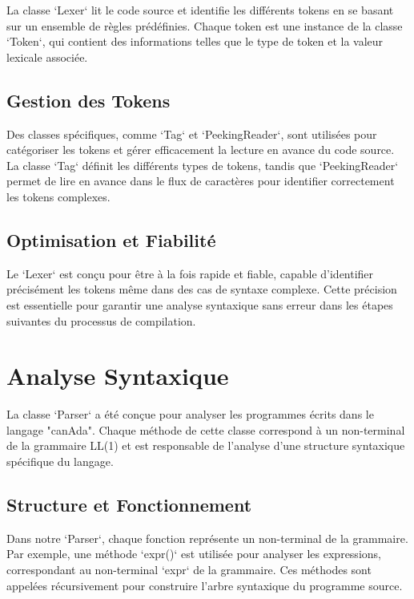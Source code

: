 \documentclass[french,a4paper]{article}
\begin{document}
    La classe `Lexer` lit le code source et identifie les différents tokens en se basant sur un ensemble de règles prédéfinies. Chaque token est une instance de la classe `Token`, qui contient des informations telles que le type de token et la valeur lexicale associée.

    \subsection{Gestion des Tokens}

    Des classes spécifiques, comme `Tag` et `PeekingReader`, sont utilisées pour catégoriser les tokens et gérer efficacement la lecture en avance du code source. La classe `Tag` définit les différents types de tokens, tandis que `PeekingReader` permet de lire en avance dans le flux de caractères pour identifier correctement les tokens complexes.

    \subsection{Optimisation et Fiabilité}

    Le `Lexer` est conçu pour être à la fois rapide et fiable, capable d'identifier précisément les tokens même dans des cas de syntaxe complexe. Cette précision est essentielle pour garantir une analyse syntaxique sans erreur dans les étapes suivantes du processus de compilation.

    \section{Analyse Syntaxique}

    La classe `Parser` a été conçue pour analyser les programmes écrits dans le langage "canAda". Chaque méthode de cette classe correspond à un non-terminal de la grammaire LL(1) et est responsable de l'analyse d'une structure syntaxique spécifique du langage.

    \subsection{Structure et Fonctionnement}

    Dans notre `Parser`, chaque fonction représente un non-terminal de la grammaire. Par exemple, une méthode `expr()` est utilisée pour analyser les expressions, correspondant au non-terminal `expr` de la grammaire. Ces méthodes sont appelées récursivement pour construire l'arbre syntaxique du programme source.
\end{document}
